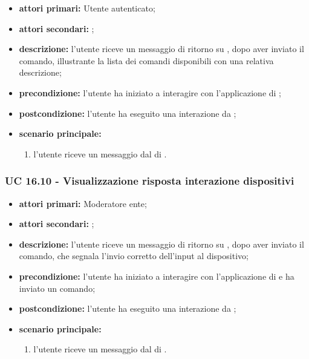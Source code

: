 	\begin{itemize}
			\item \textbf{attori primari:} Utente autenticato;
			\item \textbf{attori secondari:} ;
			\item \textbf{descrizione:} l'utente riceve un messaggio di ritorno su , dopo aver inviato il comando, illustrante la lista dei comandi disponibili con una relativa descrizione;
			\item \textbf{precondizione:} l'utente ha iniziato a interagire con l'applicazione di ;
			\item \textbf{postcondizione:} l'utente ha eseguito una interazione da ;
			\item \textbf{scenario principale:}
			\begin{enumerate}
				\item l'utente riceve un messaggio dal  di .
			\end{enumerate}
		\end{itemize}	


	\subsubsection{UC 16.10 - Visualizzazione risposta interazione dispositivi}
		
		\begin{itemize}
			\item \textbf{attori primari:} Moderatore ente;
			\item \textbf{attori secondari:} ;
			\item \textbf{descrizione:} l'utente riceve un messaggio di ritorno su , dopo aver inviato il comando, che segnala l'invio corretto dell'input al dispositivo;
			\item \textbf{precondizione:} l'utente ha iniziato a interagire con l'applicazione di  e ha inviato un comando;
			\item \textbf{postcondizione:} l'utente ha eseguito una interazione da ;
			\item \textbf{scenario principale:}
			\begin{enumerate}
				\item l'utente riceve un messaggio dal  di .
			\end{enumerate}
		\end{itemize}	

